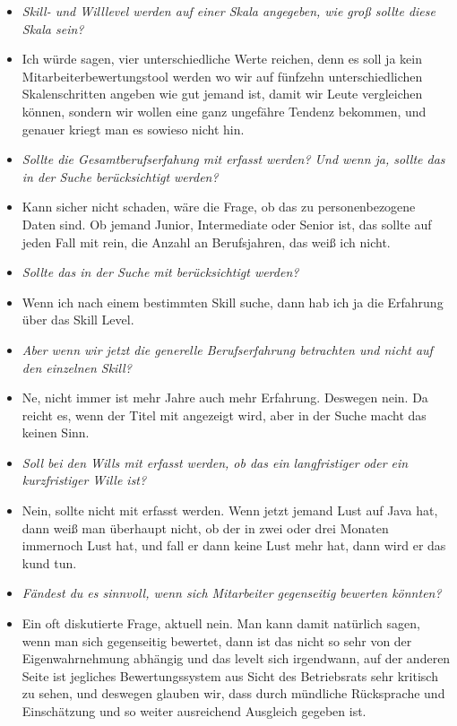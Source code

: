 \begin{appendices}
\begin{itemize}
\item[] \textit{Skill- und Willlevel werden auf einer Skala angegeben, wie groß sollte diese Skala sein?}
\item[] Ich würde sagen, vier unterschiedliche Werte reichen, denn es soll ja kein Mitarbeiterbewertungstool werden wo wir auf fünfzehn unterschiedlichen Skalenschritten angeben wie gut jemand ist, damit wir Leute vergleichen können, sondern wir wollen eine ganz ungefähre Tendenz bekommen, und genauer kriegt man es sowieso nicht hin.

\item[] \textit{Sollte die Gesamtberufserfahung mit erfasst werden? Und wenn ja, sollte das in der Suche berücksichtigt werden?}
\item[] Kann sicher nicht schaden, wäre die Frage, ob das zu personenbezogene Daten sind. Ob jemand Junior, Intermediate oder Senior ist, das sollte auf jeden Fall mit rein, die Anzahl an Berufsjahren, das weiß ich nicht.

\item[] \textit{Sollte das in der Suche mit berücksichtigt werden?}
\item[] Wenn ich nach einem bestimmten Skill suche, dann hab ich ja die Erfahrung über das Skill Level.

\item[] \textit{Aber wenn wir jetzt die generelle Berufserfahrung betrachten und nicht auf den einzelnen Skill?}
\item[] Ne, nicht immer ist mehr Jahre auch mehr Erfahrung. Deswegen nein. Da reicht es, wenn der Titel mit angezeigt wird, aber in der Suche macht das keinen Sinn.

\item[] \textit{Soll bei den Wills mit erfasst werden, ob das ein langfristiger oder ein kurzfristiger Wille ist?}
\item[] Nein, sollte nicht mit erfasst werden. Wenn jetzt jemand Lust auf Java hat, dann weiß man überhaupt nicht, ob der in zwei oder drei Monaten immernoch Lust hat, und fall er dann keine Lust mehr hat, dann wird er das kund tun.

\item[] \textit{Fändest du es sinnvoll, wenn sich Mitarbeiter gegenseitig bewerten könnten?}
\item[] Ein oft diskutierte Frage, aktuell nein. Man kann damit natürlich sagen, wenn man sich gegenseitig bewertet, dann ist das nicht so sehr von der Eigenwahrnehmung abhängig und das levelt sich irgendwann, auf der anderen Seite ist jegliches Bewertungssystem aus Sicht des Betriebsrats sehr kritisch zu sehen, und deswegen glauben wir, dass durch mündliche Rücksprache und Einschätzung und so weiter ausreichend Ausgleich gegeben ist.


\end{itemize}
\end{appendices}
